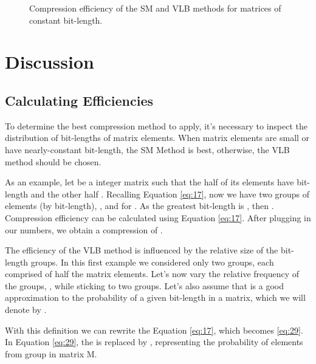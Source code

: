 \documentclass[10pt]{article}
\begin{document}
\begin{figure}[h]
  \centering
  \caption{Compression efficiency of the SM and VLB methods for matrices of constant bit-length.}
  \label{fig:1920}
\end{figure}

\section*{Discussion}

\subsection*{Calculating Efficiencies}

To determine the best compression method to apply, it's necessary to inspect the distribution of bit-lengths of matrix elements. When matrix elements are small or have nearly-constant bit-length, the SM Method is best, otherwise, the VLB method should be chosen.

As an example, let  be a integer matrix such that the half of its elements have bit-length  and the other half . Recalling Equation \ref{eq:17}, now we have two groups of elements (by bit-length), ,  and  for . As the greatest bit-length is , then . Compression efficiency  can be calculated using Equation \ref{eq:17}. After plugging in our numbers, we obtain a compression of .











The efficiency of the VLB method is influenced by the relative size of the bit-length groups. In this first example we considered only two groups, each comprised of half the matrix elements. Let's now vary the relative frequency of the groups, , while sticking to two groups. Let's also assume that  is a good approximation to the probability of a given bit-length in a matrix, which we will denote by .

With this definition we can rewrite the Equation \ref{eq:17}, which becomes \ref{eq:29}. In Equation \ref{eq:29}, the  is replaced by , representing the probability of elements from group  in matrix M.
\end{document}
